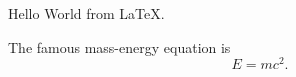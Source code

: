\documentclass{article}
\begin{document}
Hello World from \LaTeX{}.

The famous mass-energy equation is
\[E = mc^2.\] %
\end{document}
